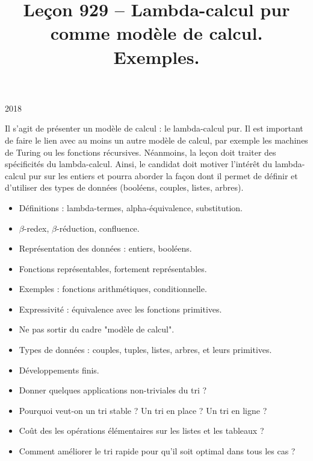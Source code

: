 \documentclass{agregfiche}
\title{Leçon 929 -- Lambda-calcul pur comme modèle de calcul. Exemples.}
\begin{document}
\maketitle

\secrapports

\begin{rapport}{2018}

Il s'agit de présenter un modèle de calcul : le lambda-calcul pur.
Il est important de faire le lien avec au moins un autre modèle de calcul, par exemple les machines de Turing ou les fonctions récursives.
Néanmoins, la leçon doit traiter des spécificités du lambda-calcul.
Ainsi, le candidat doit motiver l'intérêt du lambda-calcul pur sur les entiers et pourra aborder la façon dont il permet de définir et d'utiliser des types de données (booléens, couples, listes, arbres).

\end{rapport}

\secindispensables

\begin{itemize}
    \item Définitions : lambda-termes, alpha-équivalence, substitution.
    \item $\beta$-redex, $\beta$-réduction, confluence.
    \item Représentation des données : entiers, booléens.
    \item Fonctions représentables, fortement représentables.
    \item Exemples : fonctions arithmétiques, conditionnelle.
    \item Expressivité : équivalence avec les fonctions primitives.
\end{itemize}

\secpieges

\begin{itemize}
    \item Ne pas sortir du cadre "modèle de calcul".
\end{itemize}

\secidees

\begin{itemize}
    \item Types de données : couples, tuples, listes, arbres, et leurs primitives.
    \item Développements finis.
\end{itemize}

\secquestionsclassiques

\begin{itemize}
    \item Donner quelques applications non-triviales du tri ?
    \item Pourquoi veut-on un tri stable ? Un tri en place ? Un tri en ligne ?
    \item Coût des les opérations élémentaires sur les listes et les tableaux ?
    \item Comment améliorer le tri rapide pour qu'il soit optimal dans tous les cas ?
\end{itemize}
\end{document}
